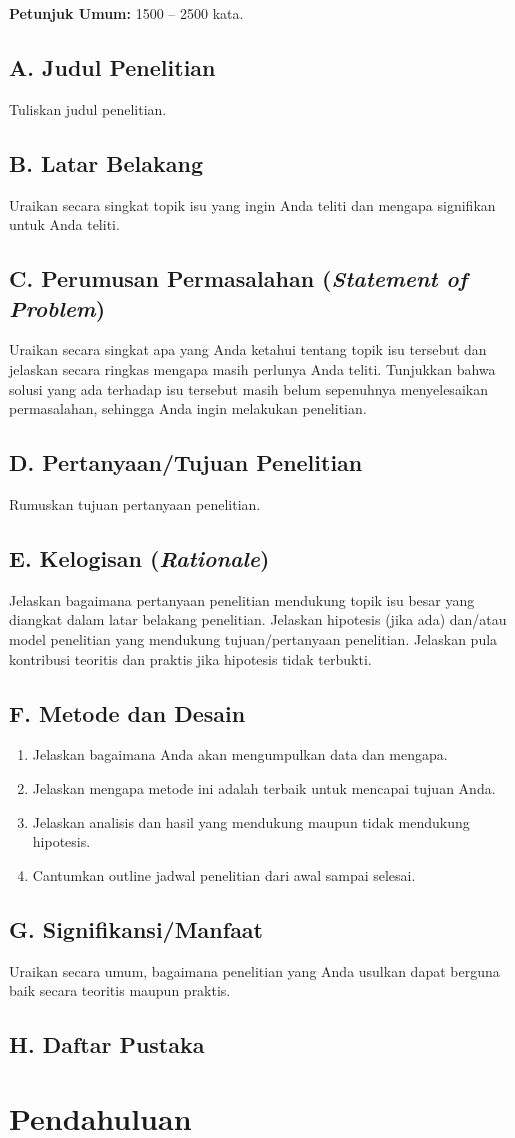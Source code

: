 \documentclass[11pt]{simart} %
\begin{document}
\noindent\textbf{Petunjuk Umum:} 1500 -- 2500 kata.

\subsection{A. Judul Penelitian}
Tuliskan judul penelitian.

\subsection{B. Latar Belakang}
Uraikan secara singkat topik isu yang ingin Anda teliti dan mengapa signifikan untuk Anda teliti.

\subsection{C. Perumusan Permasalahan (\textit{Statement of Problem})}
Uraikan secara singkat apa yang Anda ketahui tentang topik isu tersebut dan jelaskan secara ringkas mengapa masih perlunya Anda teliti. Tunjukkan bahwa solusi yang ada terhadap isu tersebut masih belum sepenuhnya menyelesaikan permasalahan, sehingga Anda ingin melakukan penelitian.

\subsection{D. Pertanyaan/Tujuan Penelitian}
Rumuskan tujuan pertanyaan penelitian.

\subsection{E. Kelogisan (\textit{Rationale})}
Jelaskan bagaimana pertanyaan penelitian mendukung topik isu besar yang diangkat dalam latar belakang penelitian. Jelaskan hipotesis (jika ada) dan/atau model penelitian yang mendukung tujuan/pertanyaan penelitian. Jelaskan pula kontribusi teoritis dan praktis jika hipotesis tidak terbukti.

\subsection{F. Metode dan Desain}
\begin{enumerate}[label=\alph*.]
	\item Jelaskan bagaimana Anda akan mengumpulkan data dan mengapa.
	\item Jelaskan mengapa metode ini adalah terbaik untuk mencapai tujuan Anda.
	\item Jelaskan analisis dan hasil yang mendukung maupun tidak mendukung hipotesis.
	\item Cantumkan outline jadwal penelitian dari awal sampai selesai.
\end{enumerate}

\subsection{G. Signifikansi/Manfaat}
Uraikan secara umum, bagaimana penelitian yang Anda usulkan dapat berguna baik secara teoritis maupun praktis.

\subsection{H. Daftar Pustaka}


\section{Pendahuluan}%
\label{sec:Pendahuluan}
\end{document}

